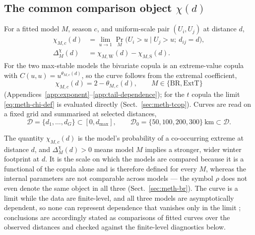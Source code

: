 \subsection{The common comparison object \texorpdfstring{$\chi(d)$}{chi(d)}}\label{sec:meth-chi}

For a fitted model \(M\), season \(c\), and uniform-scale pair \((U_i,U_j)\) at distance \(d\),
\begin{align}
  \chi_{M,c}(d)
   & =\lim_{u\to1}\Pr_M\!\bigl(U_i>u\mid U_j>u;\ d_{ij}=d\bigr),
  \label{eq:meth-chi-def}                                        \\[2pt]
  \Delta_M^{\chi}(d)
   & =\chi_{M,\mathrm W}(d)-\chi_{M,\mathrm S}(d).
  \label{eq:meth-delta-def}
\end{align}
For the two max-stable models the bivariate copula is an extreme-value copula with \(C(u,u)=u^{\theta_{M,c}(d)}\), so the curve follows from the extremal coefficient,
\begin{equation}\label{eq:meth-chi-theta}
  \chi_{M,c}(d)=2-\theta_{M,c}(d),\qquad M\in\{\mathrm{BR},\mathrm{ExtT}\}
\end{equation}
(Appendices~\ref{app:exponent}--\ref{app:tail-dependence}); for the \(t\) copula the limit \eqref{eq:meth-chi-def} is evaluated directly (Sect.~\ref{sec:meth-tcop}). Curves are read on a fixed grid and summarised at selected distances,
\begin{equation}
  \mathcal D=\{d_1,\dots,d_G\}\subset[0,d_{\max}],
  \qquad
  \mathcal D_0=\{50,100,200,300\}\ \text{km}\subset\mathcal D .
\end{equation}

The quantity \(\chi_{M,c}(d)\) is the model's probability of a co-occurring extreme at distance \(d\), and \(\Delta_M^{\chi}(d)>0\) means model \(M\) implies a stronger, wider winter footprint at \(d\). It is the scale on which the models are compared because it is a functional of the copula alone \citep{sibuya1960,coles1999} and is therefore defined for every \(M\), whereas the internal parameters are not comparable across models --- the symbol \(\rho\) does not even denote the same object in all three (Sect.~\ref{sec:meth-br}). The curve is a limit while the data are finite-level, and all three models are asymptotically dependent, so none can represent dependence that vanishes only in the limit \citep{ledford1996}; conclusions are accordingly stated as comparisons of fitted curves over the observed distances and checked against the finite-level diagnostics below.

